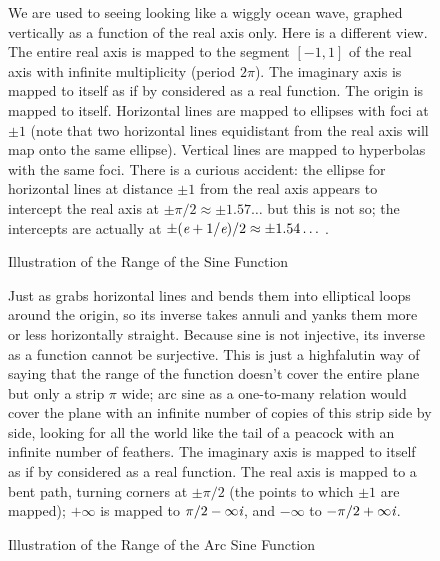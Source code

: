 \clearpage

\begin{figure}
\caption{Illustration of the Range of the Sine Function}
\small\noindent
We are used to seeing  looking like a wiggly ocean wave,
graphed vertically as a function of the real axis only.  Here is a different view.
The entire real axis is mapped to the segment $[-1, 1]$ of the real axis
with infinite multiplicity (period $2\pi$).  The imaginary axis is mapped to itself
as if by  considered as a real function.  The origin is mapped to itself.
Horizontal lines are mapped to ellipses with foci at $\pm1$ (note that two horizontal
lines equidistant from the real axis will map onto the same ellipse).
Vertical lines are mapped to hyperbolas with the same foci.  There is a curious accident:
the ellipse for horizontal
lines at distance $\pm1$ from the real axis appears to intercept the real axis at
$\pm\pi/2\approx \pm1.57\ldots$ but this is not so; the intercepts are actually at
$\pm(\emph{e}+1/\emph{e})/2\approx \pm1.54\ldots\,\hbox{}$.
\end{figure}

\clearpage

\begin{figure}
\caption{Illustration of the Range of the Arc Sine Function}
\small\noindent
Just as  grabs horizontal lines and bends them into elliptical loops around
the origin, so its inverse  takes annuli and yanks them more
or less horizontally straight.  Because sine is not injective,
its inverse as a function cannot be surjective.  This is just a highfalutin
way of saying that the range of the  function doesn't
cover the entire plane but only a strip $\pi$ wide; arc sine as a one-to-many relation
would cover the plane with an infinite number of copies of this strip side by side,
looking for all the world like the tail of a peacock with an infinite number of feathers.
The imaginary axis is mapped to itself as if by  considered as a real function.
The real axis is mapped to a bent path, turning corners at $\pm\pi/2$ (the points to
which $\pm 1$ are mapped); $+\infty$ is mapped to $\pi/2-\infty \emph{i}$, and
$-\infty$ to $-\pi/2+\infty \emph{i}$.
\end{figure}

\clearpage

